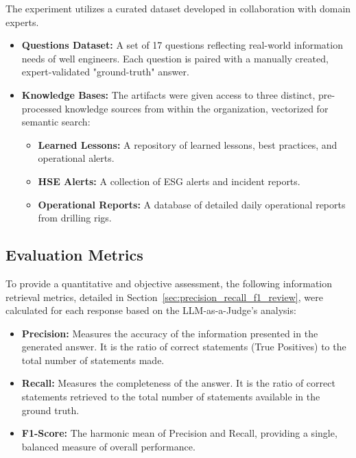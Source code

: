         The experiment utilizes a curated dataset developed in collaboration with domain experts.
        \begin{itemize}
            \item \textbf{Questions Dataset:} A set of 17 questions reflecting real-world information needs of well engineers. Each question is paired with a manually created, expert-validated "ground-truth" answer.
            \item \textbf{Knowledge Bases:} The artifacts were given access to three distinct, pre-processed knowledge sources from within the organization, vectorized for semantic search:
            \begin{itemize}
                \item \textbf{Learned Lessons:} A repository of learned lessons, best practices, and operational alerts.
                \item \textbf{HSE Alerts:} A collection of ESG alerts and incident reports.
                \item \textbf{Operational Reports:} A database of detailed daily operational reports from drilling rigs.
            \end{itemize}
        \end{itemize}

    \subsection{Evaluation Metrics}

        To provide a quantitative and objective assessment, the following information retrieval metrics, detailed in Section~\ref{sec:precision_recall_f1_review}, were calculated for each response based on the LLM-as-a-Judge's analysis:
        \begin{itemize}
            \item \textbf{Precision:} Measures the accuracy of the information presented in the generated answer. It is the ratio of correct statements (True Positives) to the total number of statements made. 
            \item \textbf{Recall:} Measures the completeness of the answer. It is the ratio of correct statements retrieved to the total number of statements available in the ground truth.
            \item \textbf{F1-Score:} The harmonic mean of Precision and Recall, providing a single, balanced measure of overall performance.
        \end{itemize}

